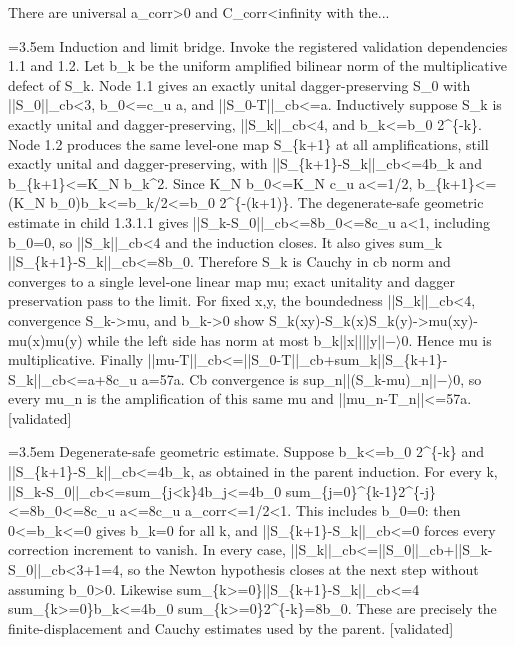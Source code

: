 \documentclass{article}
\newcommand{\step}[1]{\par\noindent\hangindent=3.5em\hangafter=1%
  \makebox[3.5em][l]{\textbf{#1.}}}
\newcommand{\steptag}[1]{\hfill{\small\textsf{[#1]}}}
\begin{document}
\begin{proofbox}{There are universal a\_corr>0 and C\_corr<infinity with the...}
\step{1.3.1} Induction and limit bridge. Invoke the registered validation dependencies 1.1 and 1.2. Let b\_k be the uniform amplified bilinear norm of the multiplicative defect of S\_k. Node 1.1 gives an exactly unital dagger-preserving S\_0 with ||S\_0||\_cb<3, b\_0<=c\_u a, and ||S\_0-T||\_cb<=a. Inductively suppose S\_k is exactly unital and dagger-preserving, ||S\_k||\_cb<4, and b\_k<=b\_0 2\textasciicircum{}\{-k\}. Node 1.2 produces the same level-one map S\_\{k+1\} at all amplifications, still exactly unital and dagger-preserving, with ||S\_\{k+1\}-S\_k||\_cb<=4b\_k and b\_\{k+1\}<=K\_N b\_k\textasciicircum{}2. Since K\_N b\_0<=K\_N c\_u a<=1/2, b\_\{k+1\}<=(K\_N b\_0)b\_k<=b\_k/2<=b\_0 2\textasciicircum{}\{-(k+1)\}. The degenerate-safe geometric estimate in child 1.3.1.1 gives ||S\_k-S\_0||\_cb<=8b\_0<=8c\_u a<1, including b\_0=0, so ||S\_k||\_cb<4 and the induction closes. It also gives sum\_k ||S\_\{k+1\}-S\_k||\_cb<=8b\_0. Therefore S\_k is Cauchy in cb norm and converges to a single level-one linear map mu; exact unitality and dagger preservation pass to the limit. For fixed x,y, the boundedness ||S\_k||\_cb<4, convergence S\_k->mu, and b\_k->0 show S\_k(xy)-S\_k(x)S\_k(y)->mu(xy)-mu(x)mu(y) while the left side has norm at most b\_k||x||||y|$|-\rangle$0. Hence mu is multiplicative. Finally ||mu-T||\_cb<=||S\_0-T||\_cb+sum\_k||S\_\{k+1\}-S\_k||\_cb<=a+8c\_u a=57a. Cb convergence is sup\_n||(S\_k-mu)\_n|$|-\rangle$0, so every mu\_n is the amplification of this same mu and ||mu\_n-T\_n||<=57a. \steptag{validated} \\[6pt]
\step{1.3.1.1} Degenerate-safe geometric estimate. Suppose b\_k<=b\_0 2\textasciicircum{}\{-k\} and ||S\_\{k+1\}-S\_k||\_cb<=4b\_k, as obtained in the parent induction. For every k, ||S\_k-S\_0||\_cb<=sum\_\{j<k\}4b\_j<=4b\_0 sum\_\{j=0\}\textasciicircum{}\{k-1\}2\textasciicircum{}\{-j\}<=8b\_0<=8c\_u a<=8c\_u a\_corr<=1/2<1. This includes b\_0=0: then 0<=b\_k<=0 gives b\_k=0 for all k, and ||S\_\{k+1\}-S\_k||\_cb<=0 forces every correction increment to vanish. In every case, ||S\_k||\_cb<=||S\_0||\_cb+||S\_k-S\_0||\_cb<3+1=4, so the Newton hypothesis closes at the next step without assuming b\_0>0. Likewise sum\_\{k>=0\}||S\_\{k+1\}-S\_k||\_cb<=4 sum\_\{k>=0\}b\_k<=4b\_0 sum\_\{k>=0\}2\textasciicircum{}\{-k\}=8b\_0. These are precisely the finite-displacement and Cauchy estimates used by the parent. \steptag{validated} \\[4pt]
\end{proofbox}
\end{document}
